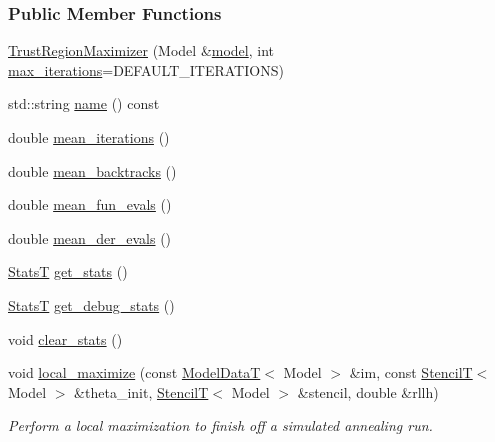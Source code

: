 \subsubsection*{Public Member Functions}
\begin{DoxyCompactItemize}
\item 
\hyperlink{classmappel_1_1TrustRegionMaximizer_a9d9002121c30cbcb3eb2833a84a6e623}{Trust\+Region\+Maximizer} (Model \&\hyperlink{classmappel_1_1Estimator_a8322546d87ccdf01f8b0dcd9dae509f0}{model}, int \hyperlink{classmappel_1_1IterativeMaximizer_ac888935f332b069836a559f44cd267c7}{max\+\_\+iterations}=D\+E\+F\+A\+U\+L\+T\+\_\+\+I\+T\+E\+R\+A\+T\+I\+O\+NS)
\item 
std\+::string \hyperlink{classmappel_1_1TrustRegionMaximizer_ac30ffdcd3f25cd0cbb066cdb5d28082a}{name} () const 
\item 
double \hyperlink{classmappel_1_1IterativeMaximizer_ae280c757d1b614dafe87200c7ed8681a}{mean\+\_\+iterations} ()
\item 
double \hyperlink{classmappel_1_1IterativeMaximizer_aac69dd736d791e2ee10cc0fa40454ee5}{mean\+\_\+backtracks} ()
\item 
double \hyperlink{classmappel_1_1IterativeMaximizer_ad66c3997d62ee2261637482f68906ef9}{mean\+\_\+fun\+\_\+evals} ()
\item 
double \hyperlink{classmappel_1_1IterativeMaximizer_ac852178ec09b7253b5b63f5300bf77a2}{mean\+\_\+der\+\_\+evals} ()
\item 
\hyperlink{namespacemappel_a04ab395b0cf82c4ce68a36b2212649a5}{StatsT} \hyperlink{classmappel_1_1IterativeMaximizer_a22783dc49fb4fd6e754b0d0ee161c543}{get\+\_\+stats} ()
\item 
\hyperlink{namespacemappel_a04ab395b0cf82c4ce68a36b2212649a5}{StatsT} \hyperlink{classmappel_1_1IterativeMaximizer_a1d9c29b69f468200a90bcd68adfb5643}{get\+\_\+debug\+\_\+stats} ()
\item 
void \hyperlink{classmappel_1_1IterativeMaximizer_af709331a98863a0d8a4003047f2b70a2}{clear\+\_\+stats} ()
\item 
void \hyperlink{classmappel_1_1IterativeMaximizer_a452cb0415d5b30de4176fcb63bf4c58b}{local\+\_\+maximize} (const \hyperlink{namespacemappel_a97f050df953605381ae9c901c3b125f1}{Model\+DataT}$<$ Model $>$ \&im, const \hyperlink{namespacemappel_a3a06598240007876f8c4bf834ad86197}{StencilT}$<$ Model $>$ \&theta\+\_\+init, \hyperlink{namespacemappel_a3a06598240007876f8c4bf834ad86197}{StencilT}$<$ Model $>$ \&stencil, double \&rllh)
\begin{DoxyCompactList}\small\item\em Perform a local maximization to finish off a simulated annealing run. \end{DoxyCompactList}\item 

\end{DoxyCompactItemize}
